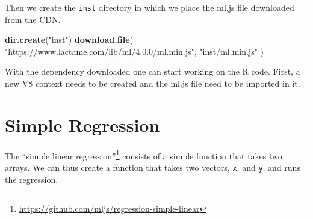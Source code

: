 \documentclass[10pt,]{krantz}
\makeatletter
\newenvironment{Shaded}{\begin{snugshade}}{\end{snugshade}}
\newcommand{\CommentTok}[1]{\textcolor[rgb]{0.37,0.37,0.37}{\textit{#1}}}
\newcommand{\ControlFlowTok}[1]{\textcolor[rgb]{0.27,0.27,0.27}{\textbf{#1}}}
\newcommand{\DataTypeTok}[1]{\textcolor[rgb]{0.27,0.27,0.27}{#1}}
\newcommand{\KeywordTok}[1]{\textcolor[rgb]{0.27,0.27,0.27}{\textbf{#1}}}
\newcommand{\NormalTok}[1]{#1}
\newcommand{\OperatorTok}[1]{\textcolor[rgb]{0.43,0.43,0.43}{\textbf{#1}}}
\newcommand{\OtherTok}[1]{\textcolor[rgb]{0.37,0.37,0.37}{#1}}
\newcommand{\StringTok}[1]{\textcolor[rgb]{0.5,0.5,0.5}{#1}}
\renewcommand{\href}[2]{#2\footnote{\url{#1}}}
\newenvironment{kframe}{%
\medskip{}
\setlength{\fboxsep}{.8em}
 \def\at@end@of@kframe{}%
 \ifinner\ifhmode%
  \def\at@end@of@kframe{\end{minipage}}%
  \begin{minipage}{\columnwidth}%
 \fi\fi%
 \def\FrameCommand##1{\hskip\@totalleftmargin \hskip-\fboxsep
 \colorbox{shadecolor}{##1}\hskip-\fboxsep
     \hskip-\linewidth \hskip-\@totalleftmargin \hskip\columnwidth}%
 \MakeFramed {\advance\hsize-\width
   \@totalleftmargin\z@ \linewidth\hsize
   \@setminipage}}%
 {\par\unskip\endMakeFramed%
 \at@end@of@kframe}
\renewenvironment{Shaded}{\begin{kframe}}{\end{kframe}}
\makeatother
\begin{document}
Then we create the \texttt{inst} directory in which we place the ml.js file downloaded from the CDN.

\begin{Shaded}
\begin{Highlighting}[]
\KeywordTok{dir.create}\NormalTok{(}\StringTok{"inst"}\NormalTok{)}
\KeywordTok{download.file}\NormalTok{(}
  \StringTok{"https://www.lactame.com/lib/ml/4.0.0/ml.min.js"}\NormalTok{, }
  \StringTok{"inst/ml.min.js"}
\NormalTok{)}
\end{Highlighting}
\end{Shaded}

With the dependency downloaded one can start working on the R code. First, a new V8 context needs to be created and the ml.js file need to be imported in it.

\begin{Shaded}
\end{Shaded}

\hypertarget{v8-ml-regression}{%
\section{Simple Regression}\label{v8-ml-regression}}

The \href{https://github.com/mljs/regression-simple-linear}{``simple linear regression''} consists of a simple function that takes two arrays. We can thus create a function that takes two vectors, \texttt{x}, and \texttt{y}, and runs the regression.

\begin{Shaded}
\end{Shaded}
\end{document}
